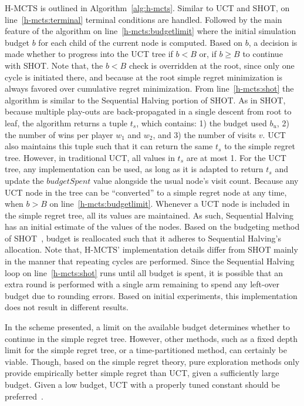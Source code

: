 \documentclass[a4paper]{llncs}
\begin{document}
H-MCTS is outlined in Algorithm~\ref{alg:h-mcts}. Similar to UCT and SHOT, on line~\ref{h-mcts:terminal} terminal conditions are handled. Followed by the main feature of the algorithm on line~\ref{h-mcts:budgetlimit} where the initial simulation budget $b$ for each child of the current node is computed. Based on $b$, a decision is made whether to progress into the UCT tree if $b<B$ or, if $b \geq B$ to continue with SHOT. Note that, the $b<B$ check is overridden at the root, since only one cycle is initiated there, and because at the root simple regret minimization is always favored over cumulative regret minimization. From line~\ref{h-mcts:shot} the algorithm is similar to the Sequential Halving portion of SHOT. As in SHOT, because multiple play-outs are back-propagated in a single descent from root to leaf, the algorithm returns a tuple $t_s$, which contains: 1) the budget used $b_u$, 2) the number of wins per player $w_1$ and $w_2$, and 3) the number of visits $v$. UCT also maintains this tuple such that it can return the same $t_s$ to the simple regret tree. However, in traditional UCT, all values in $t_s$ are at most 1. For the UCT tree, any implementation can be used, as long as it is adapted to return $t_s$ and update the $budgetSpent$ value alongside the usual node's visit count. Because any UCT node in the tree can be ``converted'' to a simple regret node at any time, when $b>B$ on line~\ref{h-mcts:budgetlimit}. Whenever a UCT node is included in the simple regret tree, all its values are maintained. As such, Sequential Halving has an initial estimate of the values of the nodes. Based on the budgeting method of SHOT~\cite{Cazenave14SHOT}, budget is reallocated such that it adheres to Sequential Halving's allocation. Note that, H-MCTS' implementation details differ from SHOT mainly in the manner that repeating cycles are performed. Since the Sequential Halving loop on line~\ref{h-mcts:shot} runs until all budget is spent, it is possible that an extra round is performed with a single arm remaining to spend any left-over budget due to rounding errors. Based on initial experiments, this implementation does not result in different results.

In the scheme presented, a limit on the available budget determines whether to continue in the simple regret tree. However, other methods, such as a fixed depth limit for the simple regret tree, or a time-partitioned method, can certainly be viable. Though, based on the simple regret theory, pure exploration methods  only provide empirically better simple regret than UCT, given a sufficiently large budget. Given a low budget, UCT with a properly tuned constant should be preferred~\cite{Bubeck11Pure}.
\end{document}
